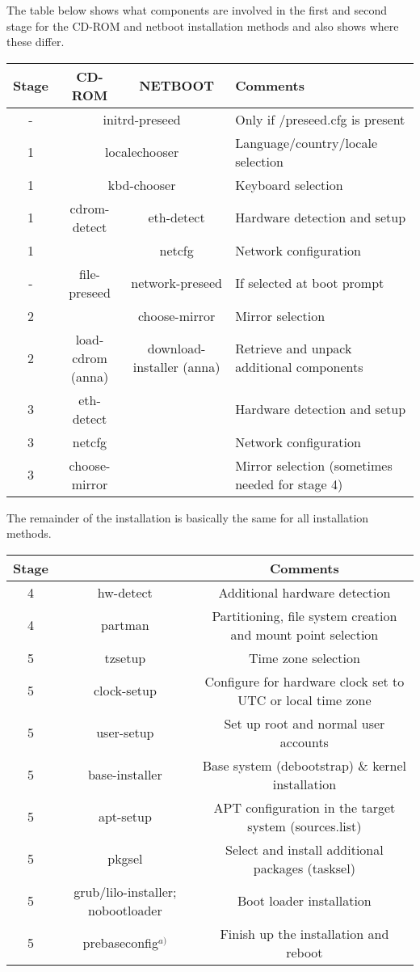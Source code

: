 \documentclass[a4paper,10pt]{article}
\begin{document}
The table below shows what components are involved in the first and second stage for the CD-ROM and netboot installation methods and also shows where these differ. 

\begin{tabular}{|c|c|c|l|}
\hline
\textbf{Stage} & \textbf{CD-ROM} & \textbf{NETBOOT} & \textbf{Comments} \\
\hline
-  & \multicolumn{2}{c|}{initrd-preseed} & Only if /preseed.cfg is present \\
\hline
1  & \multicolumn{2}{c|}{localechooser} & Language/country/locale selection \\
\hline
1 & \multicolumn{2}{c|}{kbd-chooser} & Keyboard selection \\
\hline
1 & cdrom-detect & eth-detect & Hardware detection and setup \\
\hline
1 & & netcfg & Network configuration \\
\hline
- & file-preseed & network-preseed & If selected at boot prompt \\
\hline
2 & & choose-mirror & Mirror selection \\
\hline
2 & load-cdrom (anna) & download-installer (anna) & Retrieve and unpack additional components \\
\hline
3 & eth-detect & & Hardware detection and setup \\
\hline
3 & netcfg & & Network configuration \\
\hline
3 & choose-mirror & & Mirror selection (sometimes needed for stage 4) \\
\hline
\end{tabular}

The remainder of the installation is basically the same for all installation methods. 


\begin{tabular}{|c|c|c|}
\hline
\textbf{Stage} & & \textbf{Comments} \\
\hline
4 & hw-detect & Additional hardware detection \\
\hline
4 & partman & Partitioning, file system creation and mount point selection \\
\hline
5 & tzsetup & Time zone selection \\
\hline
5 & clock-setup & Configure for hardware clock set to UTC or local time zone \\
\hline
5 & user-setup & Set up root and normal user accounts \\
\hline
5 & base-installer & Base system (debootstrap) \& kernel installation \\
\hline
5 & apt-setup & APT configuration in the target system (sources.list) \\
\hline
5 & pkgsel & Select and install additional packages (tasksel) \\
\hline
5 & grub/lilo-installer; nobootloader & Boot loader installation \\
\hline
5 & prebaseconfig$^{a)}$ & Finish up the installation and reboot \\
\hline
\end{tabular} 
\end{document}
